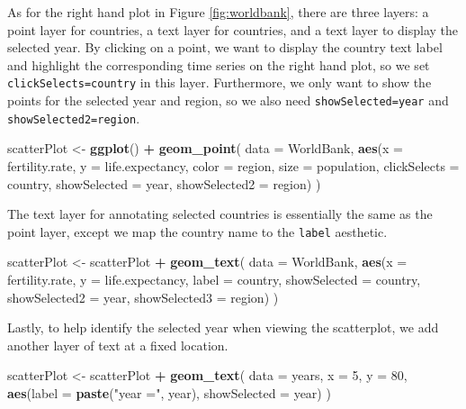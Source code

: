 \documentclass[12pt,]{article}
\newenvironment{Shaded}{\begin{snugshade}}{\end{snugshade}}
\newcommand{\KeywordTok}[1]{\textcolor[rgb]{0.13,0.29,0.53}{\textbf{#1}}}
\newcommand{\DataTypeTok}[1]{\textcolor[rgb]{0.13,0.29,0.53}{#1}}
\newcommand{\DecValTok}[1]{\textcolor[rgb]{0.00,0.00,0.81}{#1}}
\newcommand{\StringTok}[1]{\textcolor[rgb]{0.31,0.60,0.02}{#1}}
\newcommand{\OperatorTok}[1]{\textcolor[rgb]{0.81,0.36,0.00}{\textbf{#1}}}
\newcommand{\NormalTok}[1]{#1}
\theoremstyle{definition}
\theoremstyle{definition}
\theoremstyle{remark}
\begin{document}
As for the right hand plot in Figure \ref{fig:worldbank}, there are
three layers: a point layer for countries, a text layer for countries,
and a text layer to display the selected year. By clicking on a point,
we want to display the country text label and highlight the
corresponding time series on the right hand plot, so we set
\texttt{clickSelects=country} in this layer. Furthermore, we only want
to show the points for the selected year and region, so we also need
\texttt{showSelected=year} and \texttt{showSelected2=region}.

\begin{Shaded}
\begin{Highlighting}[]
\NormalTok{scatterPlot <-}\StringTok{ }\KeywordTok{ggplot}\NormalTok{() }\OperatorTok{+}\StringTok{ }\KeywordTok{geom_point}\NormalTok{(}
  \DataTypeTok{data =}\NormalTok{ WorldBank,}
  \KeywordTok{aes}\NormalTok{(}\DataTypeTok{x =}\NormalTok{ fertility.rate, }\DataTypeTok{y =}\NormalTok{ life.expectancy,}
      \DataTypeTok{color =}\NormalTok{ region, }\DataTypeTok{size =}\NormalTok{ population,}
      \DataTypeTok{clickSelects =}\NormalTok{ country,}
      \DataTypeTok{showSelected =}\NormalTok{ year,}
      \DataTypeTok{showSelected2 =}\NormalTok{ region)}
\NormalTok{)}
\end{Highlighting}
\end{Shaded}

The text layer for annotating selected countries is essentially the same
as the point layer, except we map the country name to the \texttt{label}
aesthetic.

\begin{Shaded}
\begin{Highlighting}[]
\NormalTok{scatterPlot <-}\StringTok{ }\NormalTok{scatterPlot }\OperatorTok{+}\StringTok{ }\KeywordTok{geom_text}\NormalTok{(}
  \DataTypeTok{data =}\NormalTok{ WorldBank,}
  \KeywordTok{aes}\NormalTok{(}\DataTypeTok{x =}\NormalTok{ fertility.rate, }\DataTypeTok{y =}\NormalTok{ life.expectancy,}
      \DataTypeTok{label =}\NormalTok{ country,}
      \DataTypeTok{showSelected =}\NormalTok{ country,}
      \DataTypeTok{showSelected2 =}\NormalTok{ year,}
      \DataTypeTok{showSelected3 =}\NormalTok{ region)}
\NormalTok{)}
\end{Highlighting}
\end{Shaded}

Lastly, to help identify the selected year when viewing the scatterplot,
we add another layer of text at a fixed location.

\begin{Shaded}
\begin{Highlighting}[]
\NormalTok{scatterPlot <-}\StringTok{ }\NormalTok{scatterPlot }\OperatorTok{+}\StringTok{ }\KeywordTok{geom_text}\NormalTok{(}
  \DataTypeTok{data =}\NormalTok{ years, }\DataTypeTok{x =} \DecValTok{5}\NormalTok{, }\DataTypeTok{y =} \DecValTok{80}\NormalTok{,}
  \KeywordTok{aes}\NormalTok{(}\DataTypeTok{label =} \KeywordTok{paste}\NormalTok{(}\StringTok{"year ="}\NormalTok{, year),}
      \DataTypeTok{showSelected =}\NormalTok{ year)}
\NormalTok{)}
\end{Highlighting}
\end{Shaded}
\end{document}
